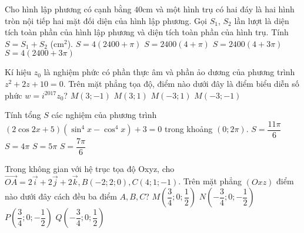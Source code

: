 \begin{ex}%
Cho hình lập phương có cạnh bằng $40$cm và một hình trụ có hai đáy là hai hình tròn nội tiếp hai mặt đối diện của hình lập phương. Gọi $S_1$, $S_2$ lần lượt là diện tích toàn phần của hình lập phương và diện tích toàn phần của hình trụ. Tính $S=S_1+S_2$ (cm$^2$).
\choice
{$S=4(2400+\pi)$}
{\True $S=2400(4+\pi)$}
{$S=2400(4+3\pi)$}
{$S=4(2400+3\pi)$}
\end{ex}

\begin{ex}%
Kí hiệu $z_0$ là nghiệm phức có phần thực âm và phần ảo dương của phương trình $z^2+2z+10=0$. Trên mặt phẳng tọa độ, điểm nào dưới đây là điểm biểu diễn số phức $w=i^{2017}z_0$?
\choice
{$M(3;-1)$}
{$M(3;1)$}
{\True $M(-3;1)$}
{$M(-3;-1)$}
\end{ex}

\begin{ex}%
Tính tổng $S$ các nghiệm của phương trình $(2\cos 2x+5)(\sin^4x-\cos^4x)+3=0$ trong khoảng $(0; 2\pi)$.
\choice
{$S=\dfrac{11\pi}{6}$}
{\True $S=4\pi $}
{$S=5\pi $}
{$S=\dfrac{7\pi}{6}$}
\end{ex}

\begin{ex}%
Trong không gian với hệ trục tọa độ Oxyz, cho $\overrightarrow{OA}=2\overrightarrow{i}+2\overrightarrow{j}+2\overrightarrow{k}, B(-2; 2; 0), C(4; 1; -1)$. Trên mặt phẳng $(Oxz)$ điểm nào dưới đây cách đều ba điểm $ A, B, C$?
\choice
{$ M\left (\dfrac{3}{4}; 0; \dfrac{1}{2}\right )$}
{$ N\left (-\dfrac{3}{4}; 0; -\dfrac{1}{2}\right )$}
{\True $ P\left (\dfrac{3}{4}; 0; -\dfrac{1}{2}\right )$}
{$ Q\left (-\dfrac{3}{4}; 0; \dfrac{1}{2}\right )$}
\end{ex}

